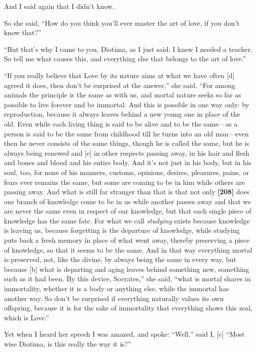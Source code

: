 And I said again that I didn't know.

So she said, “How do you think you'll ever master the art of love, if
you don't know that?”

“But that's why I came to you, Diotima, as I just said. I knew I needed
a teacher. So tell me what causes this, and everything else that belongs
to the art of love.”

“If you really believe that Love by its nature aims at what we have
often {[}d{]} agreed it does, then don't be surprised at the answer,”
she said. “For among animals the principle is the same as with us, and
mortal nature seeks so far as possible to live forever and be immortal.
And this is possible in one way only: by reproduction, because it always
leaves behind a new young one in place of the old. Even while each
living thing is said to be alive and to be the same---as a person is
said to be the same from childhood till he turns into an old man---even
then he never consists of the same things, though he is called the same,
but he is always being renewed and {[}e{]} in other respects passing
away, in his hair and flesh and bones and blood and his entire body. And
it's not just in his body, but in his soul, too, for none of his
manners, customs, opinions, desires, pleasures, pains, or fears ever
remains the same, but some are coming to be in him while others are
passing away. And what is still far stranger than that is that not only
{\bf {[}208{]}} does one branch of knowledge come to be in us while
another passes away and that we are never the same even in respect of
our knowledge, but that each single piece of knowledge has the same
fate. For what we call {\em studying} exists because knowledge is
leaving us, because forgetting is the departure of knowledge, while
studying puts back a fresh memory in place of what went away, thereby
preserving a piece of knowledge, so that it seems to be the same. And in
that way everything mortal is preserved, not, like the divine, by always
being the same in every way, but because {[}b{]} what is departing and
aging leaves behind something new, something such as it had been. By
this device, Socrates,” she said, “what is mortal shares in immortality,
whether it is a body or anything else, while the immortal has another
way. So don't be surprised if everything naturally values its own
offspring, because it is for the sake of immortality that everything
shows this zeal, which is Love.”

Yet when I heard her speech I was amazed, and spoke: “Well,” said I,
{[}c{]} “Most wise Diotima, is this really the way it is?”

